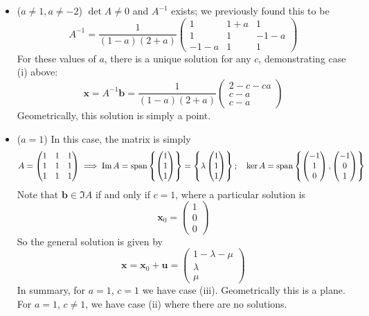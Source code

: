 \documentclass{article}
\begin{document}
\begin{itemize}
	\item ($a \neq 1, a \neq -2$) $\det A \neq 0$ and $A^{-1}$ exists; we previously found this to be
	      \[ A^{-1} = \frac{1}{(1-a)(2+a)}\begin{pmatrix}
			      1 & 1+a & 1 \\ 1 & 1 & -1-a \\ -1-a & 1 & 1
		      \end{pmatrix} \]
	      For these values of $a$, there is a unique solution for any $c$, demonstrating case (i) above:
	      \[ \bm x = A^{-1} \bm b = \frac{1}{(1-a)(2+a)}\begin{pmatrix}
			      2-c-ca \\ c-a \\ c-a
		      \end{pmatrix} \]
	      Geometrically, this solution is simply a point.
	\item ($a = 1$) In this case, the matrix is simply
	      \[ A = \begin{pmatrix}
			      1 & 1 & 1 \\ 1 & 1 & 1 \\ 1 & 1 & 1
		      \end{pmatrix} \implies \Im A = \operatorname{span} \left\{ \begin{pmatrix}
			      1 \\ 1 \\ 1
		      \end{pmatrix} \right\} = \left\{ \lambda\begin{pmatrix}
			      1 \\ 1 \\ 1
		      \end{pmatrix} \right\};\quad \ker A = \operatorname{span}\left\{ \begin{pmatrix}
			      -1 \\ 1 \\ 0
		      \end{pmatrix}, \begin{pmatrix}
			      -1 \\ 0 \\ 1
		      \end{pmatrix} \right\} \]
	      Note that $\bm b \in \Im A$ if and only if $c=1$, where a particular solution is
	      \[ \bm x_0 = \begin{pmatrix}
			      1 \\ 0 \\ 0
		      \end{pmatrix} \]
	      So the general solution is given by
	      \[ \bm x = \bm x_0 + \bm u = \begin{pmatrix}
			      1 - \lambda - \mu \\ \lambda \\ \mu
		      \end{pmatrix} \]
	      In summary, for $a=1$, $c=1$ we have case (iii). Geometrically this is a plane. For $a=1$, $c \neq 1$, we have case (ii) where there are no solutions.


\end{itemize}
\end{document}
